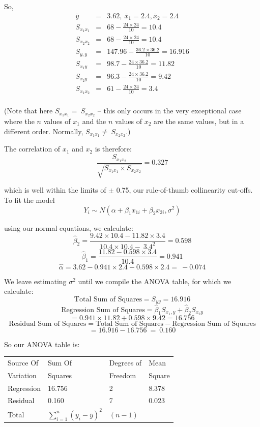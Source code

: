 \documentclass[12pt,a4paper,openany,twoside]{report}
\theoremstyle{definition}
\theoremstyle{remark}
\theoremstyle{plain}
\theoremstyle{definition}
\theoremstyle{definition}
\theoremstyle{definition}
\theoremstyle{remark}
\begin{document}
So,
\begin{eqnarray*}
\bar{y} &=& 3.62,\ {\bar{x}}_{1} = 2.4,{\bar{x}}_{2} = 2.4\\
S_{x_{1}x_{1}} &=& 68 - \frac{24\times 24}{10} = 10.4\ \\
S_{x_{2}x_{2}} &=& 68 - \frac{24\times 24}{10} = 10.4\\
S_{y,y} &=& 147.96 - \frac{36.2\times 36.2}{10} = 16.916\\
S_{x_{1}y} &=& 98.7 - \frac{24\times 36.2}{10} = 11.82\\
S_{x_{2}y} &=& 96.3 - \frac{24\times 36.2}{10} = 9.42\\
S_{x_{1}x_{2}} &=& 61 - \frac{24\times 24}{10} = 3.4\\
\end{eqnarray*}

(Note that here \(S_{x_{1}x_{1}} = \ S_{x_{2}x_{2}}\) -- this
only occurs in the very exceptional case where the \(n\) values of \(x_{1}\)
and the \(n\) values of \(x_{2}\) are the same values, but in a different
order. Normally,
\(S_{x_{1}x_{1}} \neq \ S_{x_{2}x_{2}}\).)

The correlation of \(x_{1}\) and \(x_{2}\) is therefore:
\[\frac{S_{x_{1}x_{2}}}{\sqrt{S_{x_{1}x_{1}}\times S_{x_{2}x_{2}}}} = 0.327 \]

which is well within the limits of \(\pm\) 0.75, our rule-of-thumb collinearity cut-offs. To fit the model
\[Y_{i}\sim N(\alpha + \beta_{1}x_{1i} + \beta_{2}x_{2i},\sigma^{2})\]

using our normal equations, we calculate:
\[{\hat{\beta}}_{2} = \frac{9.42\times 10.4 - 11.82\times 3.4}{10.4\times 10.4 - \ {3.4}^{2}} = 0.598\]
\[{\hat{\beta}}_{1} = \frac{11.82 - 0.598\times 3.4}{10.4} = 0.941\]
\[\hat{\alpha} = 3.62 - 0.941\times 2.4 - 0.598\times 2.4 = \  - 0.074\]

We leave estimating \(\sigma^{2}\) until we compile the ANOVA table, for
which we calculate:
\[\mbox{Total Sum of Squares} = S_{yy} = 16.916\]
\[\mbox{Regression Sum of Squares} = {\hat{\beta}}_{1}S_{x_{1},y} + {\hat{\beta}}_{2}S_{x_{2}y}\]
\[= 0.941\times 11.82 + 0.598\times 9.42 = 16.756\]
\[\mbox{Residual Sum of Squares} = \mbox{Total Sum of Squares} - \mbox{Regression Sum of Squares}\]
\[= 16.916 - 16.756\ = \ 0.160\]

So our ANOVA table is:\newline

\begin{longtable}[c]{@{}llll@{}}
\toprule
Source Of & Sum Of & Degrees of & Mean\\
Variation & Squares & Freedom & Square \tabularnewline
\midrule
Regression&16.756 & 2 & 8.378 \\
Residual& 0.160 & 7 & 0.023
\tabularnewline
\midrule
Total&
$\sum_{i = 1}^{n}{(y_{i} - \bar{y})}^{2}$ &
$(n - 1)$ & \tabularnewline
\bottomrule
\end{longtable}
\end{document}
